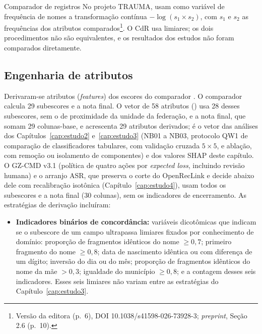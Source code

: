 \begin{chapter}{Comparador de registros}
No projeto TRAUMA,  usam como variável de frequência de nomes a transformação contínua $-\log(s_1 \times s_2)$, com $s_1$ e $s_2$ as frequências dos atributos comparados\footnote{Versão da editora (p.~6), DOI 10.1038/s41598-026-73928-3; \textit{preprint}, Seção 2.6 (p.~10).}. O CdR usa limiares; os dois procedimentos não são equivalentes, e os resultados dos estudos não foram comparados diretamente.

\subsection{Engenharia de atributos}\label{sec:engenharia-atributos}

Derivaram-se atributos (\textit{features}) dos escores do comparador \cite{Jardim2025comparador}. O comparador calcula 29 subescores e a nota final. O vetor de 58 atributos () usa 28 desses subescores, sem o de proximidade da unidade da federação, e a nota final, que somam 29 colunas-base, e acrescenta 29 atributos derivados; é o vetor das análises dos Capítulos~\ref{cap:estudo2} e~\ref{cap:estudo3} (NB01 a NB03, protocolo QW1 de comparação de classificadores tabulares, com validação cruzada $5 \times 5$, e ablação, com remoção ou isolamento de componentes) e dos valores SHAP deste capítulo. O GZ-CMD v3.1 (política de quatro ações por \textit{expected loss}, incluindo revisão humana) e o arranjo ASR, que preserva o corte do OpenRecLink e decide abaixo dele com recalibração isotônica (Capítulo~\ref{cap:estudo4}), usam todos os subescores e a nota final (30 colunas), sem os indicadores de encerramento. As estratégias de derivação incluíram:

\begin{sloppypar}
\begin{itemize}
\item \textbf{Indicadores binários de concordância:} variáveis dicotômicas que indicam se o subescore de um campo ultrapassa limiares fixados por conhecimento de domínio: proporção de fragmentos idênticos do nome $\geq 0{,}7$; primeiro fragmento do nome $\geq 0{,}8$; data de nascimento idêntica ou com diferença de um dígito; inversão do dia ou do mês; proporção de fragmentos idênticos do nome da mãe $> 0{,}3$; igualdade do município $\geq 0{,}8$; e a contagem desses seis indicadores. Esses seis limiares não variam entre as estratégias do Capítulo~\ref{cap:estudo3}.


\end{itemize}
\end{sloppypar}
\end{chapter}
